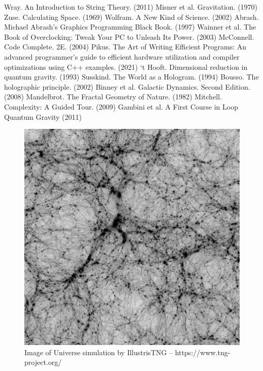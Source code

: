 \documentclass[12pt]{article}
\begin{document}
{\pagebreak







\begin{thebibliography}{9}

 Wray. An Introduction to String Theory. (2011)
 Misner et al. Gravitation. (1970)
 Zuse. Calculating Space. (1969)
 Wolfram. A New Kind of Science. (2002)
 Abrash. Michael Abrash's Graphics Programming Black Book. (1997)
 Wainner et al. The Book of Overclocking: Tweak Your PC to Unleash Its Power. (2003)
 McConnell. Code Complete. 2E. (2004)
 Pikus. The Art of Writing Efficient Programs: An advanced programmer's guide to efficient hardware utilization and compiler optimizations using C++ examples. (2021)
 `t Hooft. Dimensional reduction in quantum gravity. (1993)
 Susskind. The World as a Hologram. (1994)
 Bousso. The holographic principle. (2002)
 Binney et al. Galactic Dynamics. Second Edition. (2008)
 Mandelbrot. The Fractal Geometry of Nature. (1982)
 Mitchell. Complexity: A Guided Tour. (2009)
 Gambini et al. A First Course in Loop Quantum Gravity (2011)









\end{thebibliography}


\pagebreak


\begin{figure} 
\centering
  \includegraphics[width = 2 in]{TNG.png}
  \caption{ Image of Universe simulation by IllustrisTNG -- https://www.tng-project.org/
}
\end{figure}

}
\end{document}

